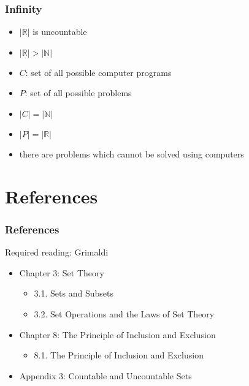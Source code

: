 \documentclass[dvipsnames]{beamer}
\begin{document}
\begin{frame}
  \frametitle{Infinity}

  \begin{itemize}
    \item $|\mathbb{R}|$ is uncountable
    \item $|\mathbb{R}| > |\mathbb{N}|$

    \pause
    \medskip
    \item $C$: set of all possible computer programs
    \item $P$: set of all possible problems
    \item $|C| = |\mathbb{N}|$
    \item $|P| = |\mathbb{R}|$

    \pause
    \medskip
    \item there are problems which cannot be solved using computers
  \end{itemize}
\end{frame}

\section*{References}

\begin{frame}
  \frametitle{References}

  \begin{block}{Required reading: Grimaldi}
    \begin{itemize}
      \item Chapter 3: Set Theory
      \begin{itemize}
        \item 3.1. \alert{Sets and Subsets}
        \item 3.2. \alert{Set Operations and the Laws of Set Theory}
      \end{itemize}

      \item Chapter 8: The Principle of Inclusion and Exclusion
      \begin{itemize}
        \item 8.1. \alert{The Principle of Inclusion and Exclusion}
      \end{itemize}

      \item Appendix 3: \alert{Countable and Uncountable Sets}
    \end{itemize}
  \end{block}
\end{frame}
\end{document}
